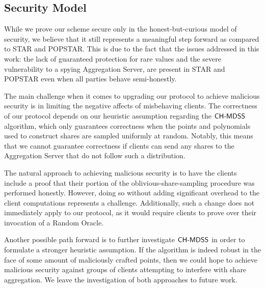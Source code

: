 \subsection{Security Model}

While we prove our scheme secure only in the honest-but-curious model of security, we believe that it still represents a meaningful step forward as compared to STAR and POPSTAR.
This is due to the fact that the issues addressed in this work: the lack of guaranteed protection for rare values and the severe vulnerability to a spying Aggregation Server, are present in STAR and POPSTAR even when all parties behave semi-honestly.

The main challenge when it comes to upgrading our protocol to achieve malicious security is in limiting the negative affects of misbehaving clients.
The correctness of our protocol depends on our heuristic assumption regarding the ${\sf CH\text{-}MDSS}$ algorithm, which only guarantees correctness when the points and polynomials used to construct shares are sampled uniformly at random.
Notably, this means that we cannot guarantee correctness if clients can send any shares to the Aggregation Server that do not follow such a distribution.

The natural approach to achieving malicious security is to have the clients include a proof that their portion of the oblivious-share-sampling procedure was performed honestly.
However, doing so without adding significant overhead to the client computations represents a challenge.
Additionally, such a change does not immediately apply to our protocol, as it would require clients to prove over their invocation of a Random Oracle.

Another possible path forward is to further investigate ${\sf CH\text{-}MDSS}$ in order to formulate a stronger heuristic assumption.
If the algorithm is indeed robust in the face of some amount of maliciously crafted points, then we could hope to achieve malicious security against groups of clients attempting to interfere with share aggregation.
We leave the investigation of both approaches to future work.
